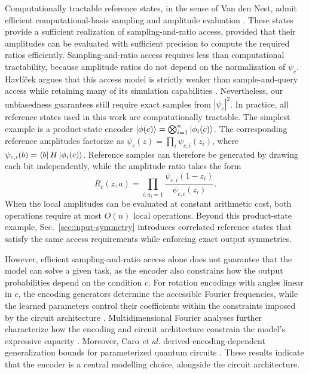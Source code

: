 \documentclass[pra,aps,10pt,twocolumn,floatfix,superscriptaddress, notitlepage,longbibliography]{revtex4-2}
\begin{document}
Computationally tractable reference states, in the sense of Van den Nest, admit efficient computational-basis sampling and amplitude evaluation \cite{nestSimulatingQuantumComputers2011}. These states provide a sufficient realization of sampling-and-ratio access, provided that their amplitudes can be evaluated with sufficient precision to compute the required ratios efficiently. Sampling-and-ratio access requires less than computational tractability, because amplitude ratios do not depend on the normalization of $\psi_c$. Havl\'{i}\v{c}ek argues that this access model is strictly weaker than sample-and-query access while retaining many of its simulation capabilities \cite{havlicekAmplitudeRatiosNeural2023}. Nevertheless, our unbiasedness guarantees still require exact samples from $|\psi_c|^2$. In practice, all reference states used in this work are computationally tractable. The simplest example is a product-state encoder $\ket{\phi(c)}=\bigotimes_{i=1}^{n}\ket{\phi_i(c)}$. The corresponding reference amplitudes factorize as $\psi_c(z)=\prod_i\psi_{c,i}(z_i)$, where $\psi_{c,i}(b)=\bra{b}H\ket{\phi_i(c)}$. Reference samples can therefore be generated by drawing each bit independently, while the amplitude ratio takes the form
\begin{equation}
R_c(z,a)=
\prod_{i:a_i=1}
\frac{\psi_{c,i}(1-z_i)}{\psi_{c,i}(z_i)}.
\end{equation}
When the local amplitudes can be evaluated at constant arithmetic cost, both operations require at most $O(n)$ local operations. Beyond this product-state example, Sec.~\ref{sec:input-symmetry} introduces correlated reference states that satisfy the same access requirements while enforcing exact output symmetries.

However, efficient sampling-and-ratio access alone does not guarantee that the model can solve a given task, as the encoder also constrains how the output probabilities depend on the condition $c$. For rotation encodings with angles linear in $c$, the encoding generators determine the accessible Fourier frequencies, while the learned parameters control their coefficients within the constraints imposed by the circuit architecture \cite{schuldEffectDataEncoding2021}. Multidimensional Fourier analyses further characterize how the encoding and circuit architecture constrain the model's expressive capacity \cite{casasMultidimensionalFourier2023}. Moreover, Caro \textit{et al.} derived encoding-dependent generalization bounds for parameterized quantum circuits \cite{caroEncodingdependentGeneralizationBounds2021}. These results indicate that the encoder is a central modelling choice, alongside the circuit architecture.
\end{document}
